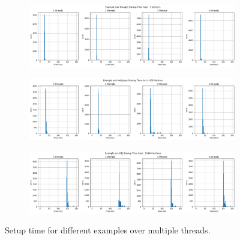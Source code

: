 \documentclass[12pt]{report}
\theoremstyle{definition}
\begin{document}
{      \begin{figure}
        \begin{subfigure}[b]{\textwidth}
          \includegraphics[width=\textwidth]{images/triangle_setup.png}
        \end{subfigure}
        \begin{subfigure}[b]{\textwidth}
          \includegraphics[width=\textwidth]{images/multipass_setup.png}
        \end{subfigure}
        \begin{subfigure}[b]{\textwidth}
          \includegraphics[width=\textwidth]{images/obj_setup.png}
        \end{subfigure}
        \caption{Setup time for different examples over multiple threads.}
        \label{fig:setup}                        
      \end{figure}
      
      \clearpage
    }
  
\end{document}
